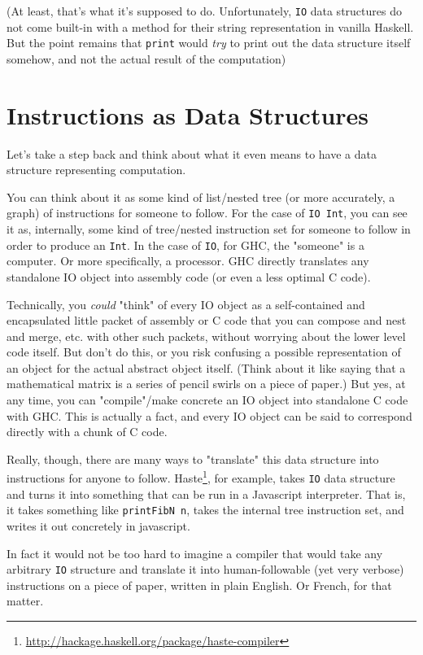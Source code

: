 \documentclass[]{article}
\renewcommand{\href}[2]{#2\footnote{\url{#1}}}
\begin{document}
(At least, that's what it's supposed to do. Unfortunately, \texttt{IO} data
structures do not come built-in with a method for their string representation in
vanilla Haskell. But the point remains that \texttt{print} would \emph{try} to
print out the data structure itself somehow, and not the actual result of the
computation)

\section{Instructions as Data Structures}

Let's take a step back and think about what it even means to have a data
structure representing computation.

You can think about it as some kind of list/nested tree (or more accurately, a
graph) of instructions for someone to follow. For the case of \texttt{IO\ Int},
you can see it as, internally, some kind of tree/nested instruction set for
someone to follow in order to produce an \texttt{Int}. In the case of
\texttt{IO}, for GHC, the "someone" is a computer. Or more specifically, a
processor. GHC directly translates any standalone IO object into assembly code
(or even a less optimal C code).

Technically, you \emph{could} "think" of every IO object as a self-contained and
encapsulated little packet of assembly or C code that you can compose and nest
and merge, etc. with other such packets, without worrying about the lower level
code itself. But don't do this, or you risk confusing a possible representation
of an object for the actual abstract object itself. (Think about it like saying
that a mathematical matrix is a series of pencil swirls on a piece of paper.)
But yes, at any time, you can "compile"/make concrete an IO object into
standalone C code with GHC. This is actually a fact, and every IO object can be
said to correspond directly with a chunk of C code.

Really, though, there are many ways to "translate" this data structure into
instructions for anyone to follow.
\href{http://hackage.haskell.org/package/haste-compiler}{Haste}, for example,
takes \texttt{IO} data structure and turns it into something that can be run in
a Javascript interpreter. That is, it takes something like
\texttt{printFibN\ n}, takes the internal tree instruction set, and writes it
out concretely in javascript.

In fact it would not be too hard to imagine a compiler that would take any
arbitrary \texttt{IO} structure and translate it into human-followable (yet very
verbose) instructions on a piece of paper, written in plain English. Or French,
for that matter.
\end{document}
